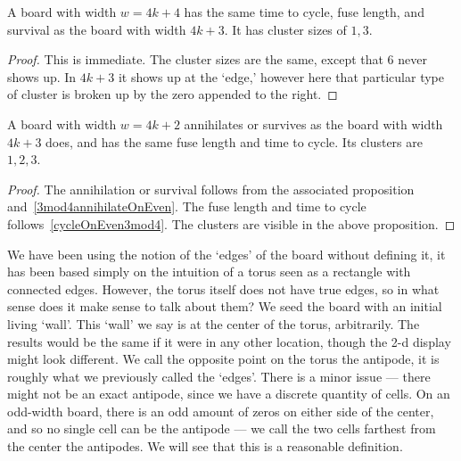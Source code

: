 \documentclass[12pt,letterpaper]{article}
\begin{document}
\begin{cor}\label{4mod4like3mod4}
  A board with width $w=4k+4$ has the same time to cycle, fuse length, and survival as the board with width $4k+3$. It has cluster sizes of $1,3$. 
\end{cor}
\begin{proof}
  This is immediate. The cluster sizes are the same, except that 6 never shows up. In $4k+3$ it shows up at the `edge,' however here that particular type of cluster is broken up by the zero appended to the right.
\end{proof}

\begin{cor}\label{2mod4Characterization}
  A board with width $w=4k+2$ annihilates or survives as the board with width $4k+3$ does, and has the same fuse length and time to cycle. Its clusters are $1,2,3$. 
\end{cor}
\begin{proof}
  The annihilation or survival follows from the associated proposition and~\cref{3mod4annihilateOnEven}. The fuse length and time to cycle follows~\cref{cycleOnEven3mod4}. The clusters are visible in the above proposition.
\end{proof}

We have been using the notion of the `edges' of the board without defining it, it has been based simply on the intuition of a torus seen as a rectangle with connected edges. However, the torus itself does not have true edges, so in what sense does it make sense to talk about them? We seed the board with an initial living `wall'. This `wall' we say is at the center of the torus, arbitrarily. The results would be the same if it were in any other location, though the 2-d display might look different. We call the opposite point on the torus the antipode, it is roughly what we previously called the `edges'. There is a minor issue --- there might not be an exact antipode, since we have a discrete quantity of cells. On an odd-width board, there is an odd amount of zeros on either side of the center, and so no single cell can be the antipode --- we call the two cells farthest from the center the antipodes. We will see that this is a reasonable definition.
\end{document}
